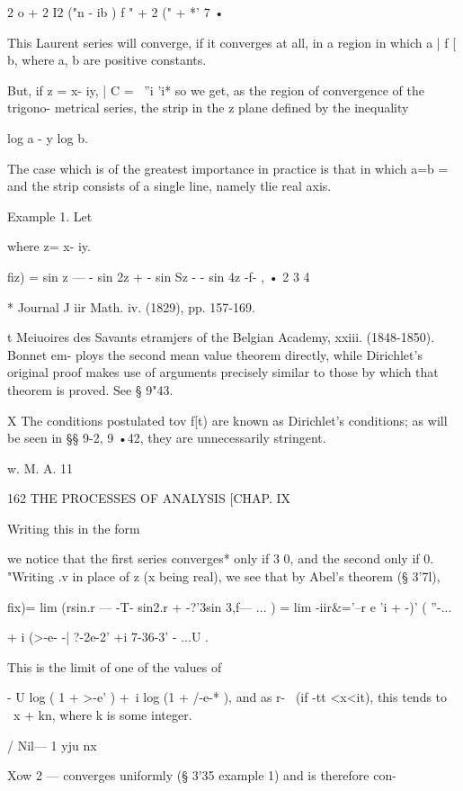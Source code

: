 2 o + 2 I2 ("n - ib ) f " + 2 (" + *' 7 •

This Laurent series will converge, if it converges at all, in a region
in which a | f [ b, where a, b are positive constants.

But, if z = x- iy, | C = ~''i 'i* so we get, as the region of
convergence of the trigono- metrical series, the strip in the z plane
defined by the inequality

log a - y log b.

The case which is of the greatest importance in practice is that in
which a=b = \, and the strip consists of a single line, namely tlie
real axis.

Example 1. Let



where z= x- iy.



fiz) = sin z — - sin 2z + - sin Sz - - sin 4z -f- , • 2 3 4



* Journal J iir Math. iv. (1829), pp. 157-169.

t Meiuoires des Savants etramjers of the Belgian Academy, xxiii.
(1848-1850). Bonnet em- ploys the second mean value theorem directly,
while Dirichlet's original proof makes use of arguments precisely
similar to those by which that theorem is proved. See § 9"43.

X The conditions postulated tov f[t) are known as Dirichlet's
conditions; as will be seen in §§ 9-2, 9 •42, they are unnecessarily
stringent.

w. M. A. 11



162 THE PROCESSES OF ANALYSIS [CHAP. IX

Writing this in the form

we notice that the first series converges* only if 3 0, and the second
only if 0. "Writing .v in place of z (x being real), we see that by
Abel's theorem (§ 3'7l),

fix)= lim (rsin.r — -T- sin2.r + -?'3sin 3,f— ... ) = lim -iir\&='--r
e 'i + -)' ( ''-...\

+ i (>-e- -| ?-2e-2' +i 7-36-3' - ...U .

This is the limit of one of the values of

- U log ( 1 + >-e' ) +\ i log (1 + /-e-* ), and as r- \ (if -tt
<x<it), this tends to \ x + kn, where k is some integer.

  / Nil— 1 yju nx

Xow 2 — converges uniformly (§ 3'35 example 1) and is therefore con-

